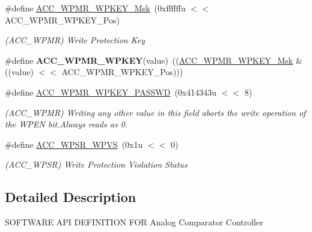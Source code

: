 \begin{DoxyCompactItemize}
\item 
\mbox{\label{group__SAME70__ACC_ga9aa68668a3abab5758d5804e187ead84}} 
\#define \mbox{\hyperlink{group__SAME70__ACC_ga9aa68668a3abab5758d5804e187ead84}{A\+C\+C\+\_\+\+W\+P\+M\+R\+\_\+\+W\+P\+K\+E\+Y\+\_\+\+Msk}}~(0xffffffu $<$$<$ A\+C\+C\+\_\+\+W\+P\+M\+R\+\_\+\+W\+P\+K\+E\+Y\+\_\+\+Pos)
\begin{DoxyCompactList}\small\item\em (A\+C\+C\+\_\+\+W\+P\+MR) Write Protection Key \end{DoxyCompactList}\item 
\mbox{\label{group__SAME70__ACC_gac6c700f13c611085e645287fa076b5c4}} 
\#define {\bfseries A\+C\+C\+\_\+\+W\+P\+M\+R\+\_\+\+W\+P\+K\+EY}(value)~((\mbox{\hyperlink{group__SAMV71__ACC_ga9aa68668a3abab5758d5804e187ead84}{A\+C\+C\+\_\+\+W\+P\+M\+R\+\_\+\+W\+P\+K\+E\+Y\+\_\+\+Msk}} \& ((value) $<$$<$ A\+C\+C\+\_\+\+W\+P\+M\+R\+\_\+\+W\+P\+K\+E\+Y\+\_\+\+Pos)))
\item 
\mbox{\label{group__SAME70__ACC_gaf8b3dd7f74ad28d3383ded796e90fb37}} 
\#define \mbox{\hyperlink{group__SAME70__ACC_gaf8b3dd7f74ad28d3383ded796e90fb37}{A\+C\+C\+\_\+\+W\+P\+M\+R\+\_\+\+W\+P\+K\+E\+Y\+\_\+\+P\+A\+S\+S\+WD}}~(0x414343u $<$$<$ 8)
\begin{DoxyCompactList}\small\item\em (A\+C\+C\+\_\+\+W\+P\+MR) Writing any other value in this field aborts the write operation of the W\+P\+EN bit.\+Always reads as 0. \end{DoxyCompactList}\item 
\mbox{\label{group__SAME70__ACC_gac5b5501d42101656c07ce85841fbef24}} 
\#define \mbox{\hyperlink{group__SAME70__ACC_gac5b5501d42101656c07ce85841fbef24}{A\+C\+C\+\_\+\+W\+P\+S\+R\+\_\+\+W\+P\+VS}}~(0x1u $<$$<$ 0)
\begin{DoxyCompactList}\small\item\em (A\+C\+C\+\_\+\+W\+P\+SR) Write Protection Violation Status \end{DoxyCompactList}\end{DoxyCompactItemize}


\subsection{Detailed Description}
S\+O\+F\+T\+W\+A\+RE A\+PI D\+E\+F\+I\+N\+I\+T\+I\+ON F\+OR Analog Comparator Controller 